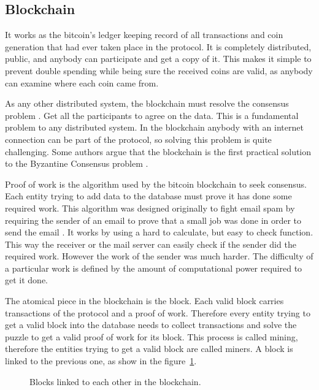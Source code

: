 \subsection{Blockchain} \label{subsec:Blockchain}
It works as the bitcoin's ledger keeping record of all transactions and coin
  generation that had ever taken place in the protocol.
It is completely distributed, public, and anybody can participate and get a
  copy of it.
This makes it simple to prevent double spending while being sure the received
  coins are valid, as anybody can examine where each coin came from.

As any other distributed system, the blockchain must resolve the consensus
  problem \cite{fischer1983consensus}. Get all the participants to agree on
  the data. This is a fundamental problem to any distributed system. In the
  blockchain anybody with an internet connection can be part of the
  protocol, so solving this problem is quite challenging. Some authors argue
  that the blockchain is the first practical solution to the Byzantine Consensus
  problem \cite{miller2014anonymous,sun2014solving}.

Proof of work is the algorithm used by the bitcoin blockchain to seek
  consensus. Each entity trying to add data to the database must prove it
  has done some required work. This algorithm was designed originally to fight
  email spam by requiring the sender of an email to prove that a small job was
  done in order to send the email \cite{dwork1992pricing}.
It works by using a hard to calculate, but easy to check function. This
  way the receiver or the mail server can easily check if the sender did
  the required work.
However the work of the sender was much harder.
The difficulty of a particular work is defined by the amount of computational
  power required to get it done.

The atomical piece in the blockchain is the block. Each valid block carries
  transactions of the protocol and a proof of work. Therefore every entity
  trying to get a valid block into the database needs to collect transactions
  and solve the puzzle to get a valid proof of work for its block.
This process is called mining, therefore the entities trying to get a valid
  block are called miners. A block is linked to the previous one, as show in the
  figure~\ref{fig:block_links}.

\begin{figure}
	\centering
	\def\svgwidth{\columnwidth}
	
	\caption{Blocks linked to each other in the blockchain.}
	\label{fig:block_links}
\end{figure}

